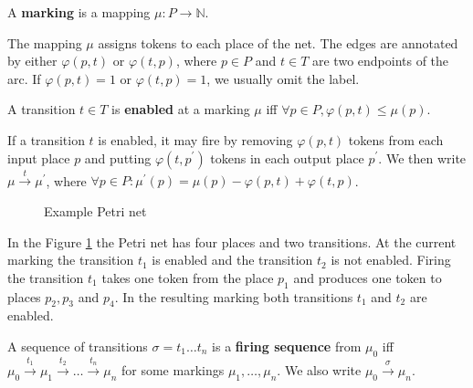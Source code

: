 \begin{definition}
  A {\bf marking} is a mapping $\mu: P\rightarrow \mathbb N$.
\end{definition}

The mapping $\mu$ assigns tokens to each place of the net. The edges are annotated by either $\varphi(p,t)$ or $\varphi(t,p)$, where $p\in P$ and $t\in T$ are two endpoints of the arc. If $\varphi(p,t)=1$ or $\varphi(t,p)=1$, we usually omit the label.

\begin{definition}
  A transition $t\in T$ is {\bf enabled} at a marking $\mu$ iff $\forall p\in P, \varphi(p,t)\leq\mu(p)$.
\end{definition}

If a transition $t$ is enabled, it may fire by removing $\varphi(p,t)$ tokens from each input place $p$ and putting $\varphi(t,p^\prime)$ tokens in each output place $p^\prime$. We then write $\mu\xrightarrow{t} \mu^\prime$, where $\forall p\in P: \mu^\prime(p) = \mu(p)-\varphi(p,t)+\varphi(t,p)$.

\begin{figure}
  \centering
  \caption{Example Petri net}
  \label{fig:example petri net}
\end{figure}

\begin{example}
  In the Figure \ref{fig:example petri net} the Petri net has four places and two transitions. At the current marking the transition $t_1$ is enabled and the transition $t_2$ is not enabled. Firing the transition $t_1$ takes one token from the place $p_1$ and produces one token to places $p_2, p_3$ and $p_4$. In the resulting marking both transitions $t_1$ and $t_2$ are enabled.
\end{example}

\begin{definition}
  A sequence of transitions $\sigma = t_1\ldots t_n$ is a {\bf firing sequence} from $\mu_0$ iff $\mu_0\xrightarrow{t_1}\mu_1\xrightarrow{t_2}\ldots\xrightarrow{t_n}\mu_n$ for some markings $\mu_1,\ldots,\mu_n$. We also write $\mu_0\xrightarrow{\sigma}\mu_n$.
\end{definition}


